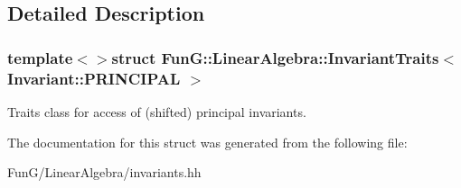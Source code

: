 \subsection{Detailed Description}
\subsubsection*{template$<$$>$struct Fun\-G\-::\-Linear\-Algebra\-::\-Invariant\-Traits$<$ Invariant\-::\-P\-R\-I\-N\-C\-I\-P\-A\-L $>$}

Traits class for access of (shifted) principal invariants. 

The documentation for this struct was generated from the following file\-:\begin{DoxyCompactItemize}
\item 
Fun\-G/\-Linear\-Algebra/invariants.\-hh\end{DoxyCompactItemize}

